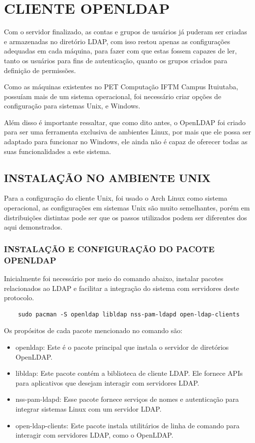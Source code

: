 \section{CLIENTE OPENLDAP}

Com o servidor finalizado, as contas e grupos de usuários já puderam ser criadas e armazenadas no diretório LDAP, com isso restou apenas as configurações adequadas em cada máquina, para fazer com que estas fossem capazes de ler, tanto os usuários para fins de autenticação, quanto os grupos criados para definição de permissões.

Como as máquinas existentes no PET Computação IFTM Campus Ituiutaba, possuíam mais de um sistema operacional, foi necessário criar opções de configuração para sistemas Unix, e Windows.

Além disso é importante ressaltar, que como dito antes, o OpenLDAP foi criado para ser uma ferramenta exclusiva de ambientes Linux, por mais que ele possa ser adaptado para funcionar no Windows, ele ainda não é capaz de oferecer todas as suas funcionalidades a este sistema.

\subsection{INSTALAÇÃO NO AMBIENTE UNIX}

Para a configuração do cliente Unix, foi usado o Arch Linux como sistema operacional, as configurações em sistemas Unix são muito semelhantes, porém em distribuições distintas pode ser que os passos utilizados podem ser diferentes dos aqui demonstrados.

\subsubsection{INSTALAÇÃO E CONFIGURAÇÃO DO PACOTE OPENLDAP}

Inicialmente foi necessário por meio do comando abaixo, instalar pacotes relacionados ao LDAP e facilitar a integração do sistema com servidores deste protocolo.

\begin{lstlisting}
    sudo pacman -S openldap libldap nss-pam-ldapd open-ldap-clients
\end{lstlisting}

Os propósitos de cada pacote mencionado no comando são:
\begin{itemize}
    \item openldap: Este é o pacote principal que instala o servidor de diretórios OpenLDAP.
    \item libldap: Este pacote contém a biblioteca de cliente LDAP. Ele fornece APIs para aplicativos que desejam interagir com servidores LDAP.
    \item nss-pam-ldapd: Esse pacote fornece serviços de nomes e autenticação para integrar sistemas Linux com um servidor LDAP.
    \item open-ldap-clients: Este pacote instala utilitários de linha de comando para interagir com servidores LDAP, como o OpenLDAP.
\end{itemize}

